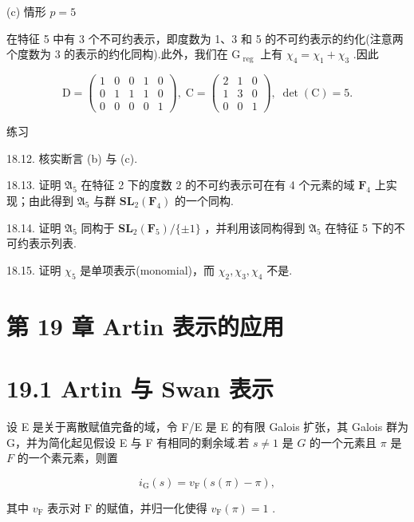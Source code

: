 \documentclass[10pt]{article}
\begin{document}
(c) 情形 \(p = 5\)

在特征 5 中有 3 个不可约表示，即度数为 1、3 和 5 的不可约表示的约化(注意两个度数为 3 的表示的约化同构).此外，我们在 \({\mathrm{G}}_{\text{ reg }}\) 上有 \({\chi }_{4} = {\chi }_{1} + {\chi }_{3}\) .因此

\[
\mathrm{D} = \left( \begin{array}{lllll} 1 & 0 & 0 & 1 & 0 \\  0 & 1 & 1 & 1 & 0 \\  0 & 0 & 0 & 0 & 1 \end{array}\right) ,\;\mathrm{C} = \left( \begin{array}{lll} 2 & 1 & 0 \\  1 & 3 & 0 \\  0 & 0 & 1 \end{array}\right) ,\;\det \left( \mathrm{C}\right)  = 5.
\]

练习

18.12. 核实断言 (b) 与 (c).

18.13. 证明 \({\mathfrak{A}}_{5}\) 在特征 2 下的度数 2 的不可约表示可在有 4 个元素的域 \({\mathbf{F}}_{4}\) 上实现；由此得到 \({\mathfrak{A}}_{5}\) 与群 \({\mathbf{{SL}}}_{2}\left( {\mathbf{F}}_{4}\right)\) 的一个同构.

18.14. 证明 \({\mathfrak{A}}_{5}\) 同构于 \({\mathbf{{SL}}}_{2}\left( {\mathbf{F}}_{5}\right) /\{  \pm  1\}\) ，并利用该同构得到 \({\mathfrak{A}}_{5}\) 在特征 5 下的不可约表示列表.

18.15. 证明 \({\chi }_{5}\) 是单项表示(monomial)，而 \({\chi }_{2},{\chi }_{3},{\chi }_{4}\) 不是.

\section*{第 19 章 Artin 表示的应用}

\section*{19.1 Artin 与 Swan 表示}

设 E 是关于离散赋值完备的域，令 F/E 是 E 的有限 Galois 扩张，其 Galois 群为 G，并为简化起见假设 E 与 F 有相同的剩余域.若 \(s \neq  1\) 是 \(G\) 的一个元素且 \(\pi\) 是 \(F\) 的一个素元素，则置

\[
{i}_{\mathrm{G}}\left( s\right)  = {v}_{\mathrm{F}}\left( {s\left( \pi \right)  - \pi }\right) ,
\]

其中 \({v}_{\mathrm{F}}\) 表示对 \(\mathrm{F}\) 的赋值，并归一化使得 \({v}_{\mathrm{F}}\left( \pi \right)  = 1\) .
\end{document}
